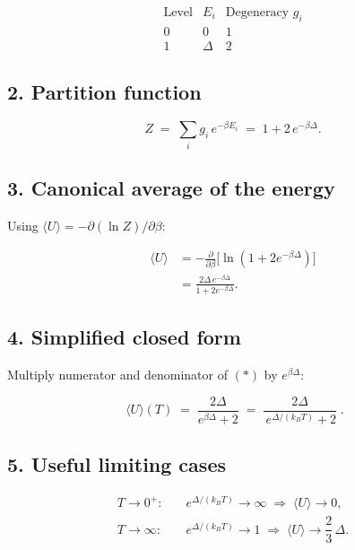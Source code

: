 \documentclass[12pt]{article}
\theoremstyle{definition} %
\theoremstyle{plain} %
\begin{document}
\[
  \begin{array}{c|c|c}
    \text{Level} & E_i & \text{Degeneracy } g_i\\ \hline
    0            & 0   & 1 \\
    1            & \Delta & 2
  \end{array}
\]

\subsection*{2.  Partition function}

\[
  Z
  \;=\;
  \sum_i g_i\,e^{-\beta E_i}
  \;=\;
  1 + 2\,e^{-\beta\Delta}.
\]

\subsection*{3.  Canonical average of the energy}

Using \(\langle U\rangle = -\partial(\ln Z)/\partial\beta\):

\begin{align}
  \langle U\rangle
  &= -\frac{\partial}{\partial\beta}\!\bigl[\ln(1+2e^{-\beta\Delta})\bigr]
     \\[6pt]
  &= \frac{2\Delta\,e^{-\beta\Delta}}{1+2e^{-\beta\Delta}}.
     \tag{*}
\end{align}

\subsection*{4.  Simplified closed form}

Multiply numerator and denominator of \((*)\) by \(e^{\beta\Delta}\):

\[
  \boxed{\;
    \langle U\rangle(T)
    \;=\;
    \frac{2\Delta}{e^{\beta\Delta}+2}
    \;=\;
    \frac{2\Delta}{\,e^{\displaystyle\Delta/(k_B T)} + 2}\; }.
\]

\subsection*{5.  Useful limiting cases}

\[
  \begin{aligned}
    T\to 0^{+}\!: &\quad e^{\Delta/(k_B T)}\!\to\!\infty
                   \;\Longrightarrow\; \langle U\rangle \to 0, \\[4pt]
    T\to\infty\!: &\quad e^{\Delta/(k_B T)}\!\to\!1
                   \;\Longrightarrow\; \langle U\rangle \to \dfrac{2}{3}\,\Delta .
  \end{aligned}
\]
\end{document}
